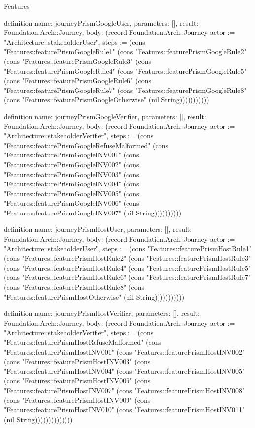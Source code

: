 \begin{lexlean}{Features}
\begin{semanticmodule}
definition{
  name: journeyPrismGoogleUser,
  parameters: [],
  result: Foundation.Arch::Journey,
  body: (record Foundation.Arch::Journey {actor := "Architecture::stakeholderUser", steps := (cons "Features::featurePrismGoogleRule1" (cons "Features::featurePrismGoogleRule2" (cons "Features::featurePrismGoogleRule3" (cons "Features::featurePrismGoogleRule4" (cons "Features::featurePrismGoogleRule5" (cons "Features::featurePrismGoogleRule6" (cons "Features::featurePrismGoogleRule7" (cons "Features::featurePrismGoogleRule8" (cons "Features::featurePrismGoogleOtherwise" (nil String))))))))))})
}

definition{
  name: journeyPrismGoogleVerifier,
  parameters: [],
  result: Foundation.Arch::Journey,
  body: (record Foundation.Arch::Journey {actor := "Architecture::stakeholderVerifier", steps := (cons "Features::featurePrismGoogleRefuseMalformed" (cons "Features::featurePrismGoogleINV001" (cons "Features::featurePrismGoogleINV002" (cons "Features::featurePrismGoogleINV003" (cons "Features::featurePrismGoogleINV004" (cons "Features::featurePrismGoogleINV005" (cons "Features::featurePrismGoogleINV006" (cons "Features::featurePrismGoogleINV007" (nil String)))))))))})
}

definition{
  name: journeyPrismHostUser,
  parameters: [],
  result: Foundation.Arch::Journey,
  body: (record Foundation.Arch::Journey {actor := "Architecture::stakeholderUser", steps := (cons "Features::featurePrismHostRule1" (cons "Features::featurePrismHostRule2" (cons "Features::featurePrismHostRule3" (cons "Features::featurePrismHostRule4" (cons "Features::featurePrismHostRule5" (cons "Features::featurePrismHostRule6" (cons "Features::featurePrismHostRule7" (cons "Features::featurePrismHostRule8" (cons "Features::featurePrismHostOtherwise" (nil String))))))))))})
}

definition{
  name: journeyPrismHostVerifier,
  parameters: [],
  result: Foundation.Arch::Journey,
  body: (record Foundation.Arch::Journey {actor := "Architecture::stakeholderVerifier", steps := (cons "Features::featurePrismHostRefuseMalformed" (cons "Features::featurePrismHostINV001" (cons "Features::featurePrismHostINV002" (cons "Features::featurePrismHostINV003" (cons "Features::featurePrismHostINV004" (cons "Features::featurePrismHostINV005" (cons "Features::featurePrismHostINV006" (cons "Features::featurePrismHostINV007" (cons "Features::featurePrismHostINV008" (cons "Features::featurePrismHostINV009" (cons "Features::featurePrismHostINV010" (cons "Features::featurePrismHostINV011" (nil String)))))))))))))})
}


\end{semanticmodule}
\end{lexlean}
